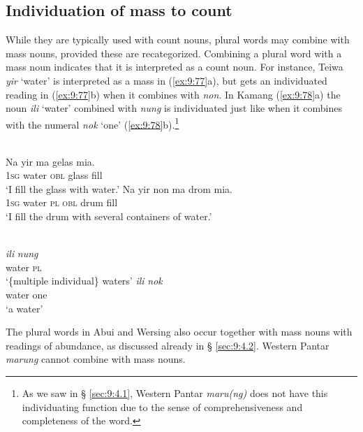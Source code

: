 \subsection{Individuation of mass to count}
While they are typically used with count nouns, plural words may combine with mass nouns, provided these are recategorized. Combining a plural word with a mass noun indicates that it is interpreted as a count noun. For instance, Teiwa \textit{yir} `water' is interpreted as a mass in (\ref{ex:9:77}a), but gets an individuated reading in (\ref{ex:9:77}b) when it combines with \textit{non}. In Kamang (\ref{ex:9:78}a) the noun \textit{ili} `water' combined with \textit{nung} is individuated just like when it combines with the numeral \textit{nok} `one' (\ref{ex:9:78}b).\footnote{As we saw in {\S} \ref{sec:9:4.1}, Western Pantar \textit{maru(ng)} does not have this individuating function due to the sense of comprehensiveness and completeness of the word.}

\newpage
\ea%
\label{ex:9:77}
 \\
\ea
\gll  Na yir ma gelas {mia}{{\textglotstop}}{.} \\
    \textsc{1sg} water \textsc{obl} glass fill \\
\glt `I fill the glass with water.'
\ex
\gll Na yir non ma drom {mia}{{\textglotstop}}{.} \\
   \textsc{1sg} water \textsc{pl} \textsc{obl} drum fill  \\
\glt  `I fill the drum with several containers of water.'
\z
\z







\ea%
\label{ex:9:78}
 \\
\ea
\gll\textit{ili} \textit{nung} \\
   water \textsc{pl} \\
 \glt `\{multiple individual\} waters' 
 \ex 
 \gll \textit{ili} \textit{nok}\\
  water one\\
\glt `a water'
\z
\z

The plural words in Abui and Wersing also occur together with mass nouns with readings of abundance, as discussed already in {\S} \ref{sec:9:4.2}. Western Pantar \textit{marung} cannot combine with mass nouns.

